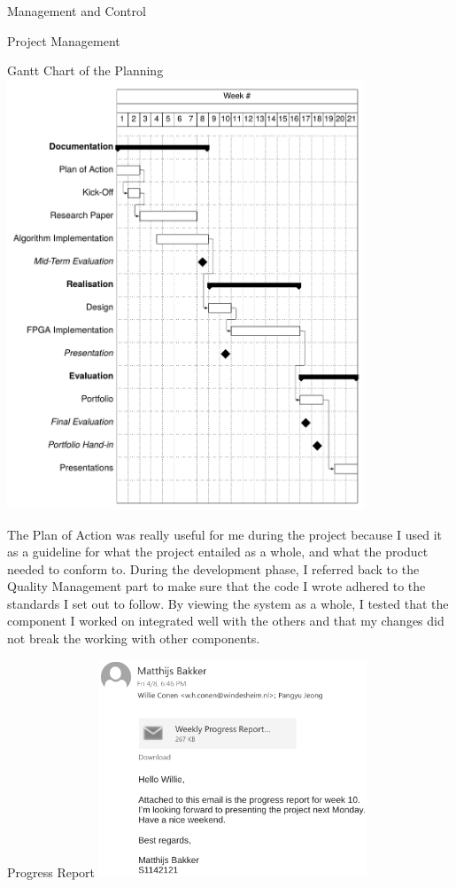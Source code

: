\documentclass{matthijs}
\begin{document}
\begin{hoofdstuk}{Management and Control}
\begin{paragraaf}{Project Management}
			\begin{figuur}{Gantt Chart of the Planning}
				\justifying
				\includegraphics[width=0.8\textwidth, clip, trim=0cm 0.25cm 0cm 12.5cm]{planning.pdf}
			\end{figuur}
			
			\noindent The Plan of Action was really useful for me during the project because I used it as a guideline for what the project entailed as a whole, and what the product needed to conform to.
			During the development phase, I referred back to the Quality Management part to make sure that the code I wrote adhered to the standards I set out to follow.
			By viewing the system as a whole, I tested that the component I worked on integrated well with the others and that my changes did not break the working with other components.

			\vspace{1ex}
			\begin{figuur}{Progress Report}
				\includegraphics[width=0.6\textwidth]{progress-crop.pdf}
				\vspace{0.5ex}
			\end{figuur}


\end{paragraaf}
\end{hoofdstuk}
\end{document}
